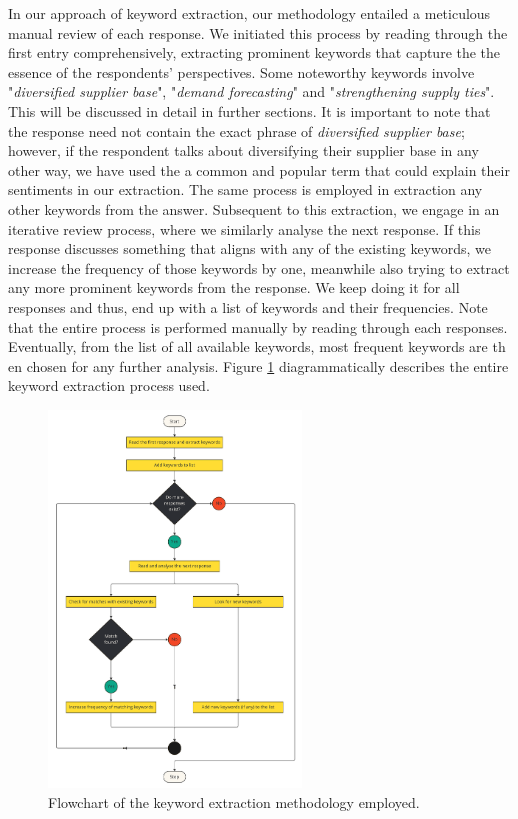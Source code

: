 In our approach of keyword extraction, our methodology entailed a meticulous manual review of each response. We initiated this process by reading through the first entry comprehensively, extracting prominent keywords that capture the the essence of the respondents' perspectives. Some noteworthy keywords involve "\textit{diversified supplier base}", "\textit{demand forecasting}" and "\textit{strengthening supply ties}". This will be discussed in detail in further sections. It is important to note that the response need not contain the exact phrase of \textit{diversified supplier base}; however, if the respondent talks about diversifying their supplier base in any other way, we have used the a common and popular term that could explain their sentiments in our extraction. The same process is employed in extraction any other keywords from the answer. Subsequent to this extraction, we engage in an iterative review process, where we similarly analyse the next response. If this response discusses something that aligns with any of the existing keywords, we increase the frequency of those keywords by one, meanwhile also trying to extract any more prominent keywords from the response. We keep doing it for all \participantCount{} responses and thus, end up with a list of keywords and their frequencies. Note that the entire process is performed manually by reading through each responses. Eventually, from the list of all available keywords, most frequent keywords are th
en chosen for any further analysis. Figure \ref{fig:kye_extraction} diagrammatically describes the entire keyword extraction process used.

\begin{figure}[ht]
  \centering
  \includegraphics[width=0.6\textwidth]{figure/keyword_extraction_flowchart.pdf}
  \caption{Flowchart of the keyword extraction methodology employed.}
  \label{fig:kye_extraction}
\end{figure}

